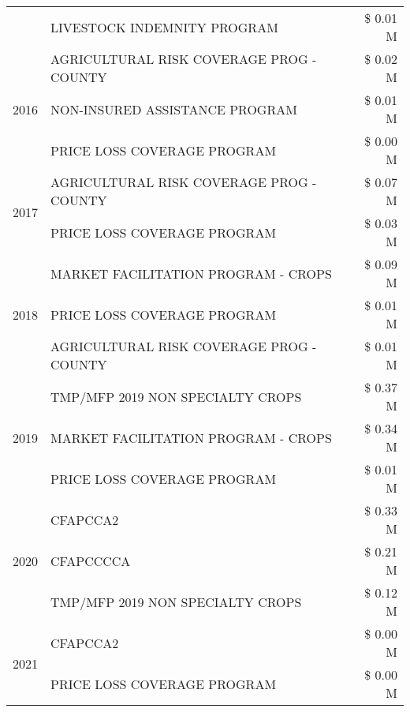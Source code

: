 \begin{tabular}{llr}
 & LIVESTOCK INDEMNITY PROGRAM & \$ 0.01 M \\
\cline{1-3}
\multirow[t]{3}{*}{2016} & AGRICULTURAL RISK COVERAGE PROG - COUNTY & \$ 0.02 M \\
 & NON-INSURED ASSISTANCE PROGRAM & \$ 0.01 M \\
 & PRICE LOSS COVERAGE PROGRAM & \$ 0.00 M \\
\cline{1-3}
\multirow[t]{2}{*}{2017} & AGRICULTURAL RISK COVERAGE PROG - COUNTY & \$ 0.07 M \\
 & PRICE LOSS COVERAGE PROGRAM & \$ 0.03 M \\
\cline{1-3}
\multirow[t]{3}{*}{2018} & MARKET FACILITATION PROGRAM - CROPS & \$ 0.09 M \\
 & PRICE LOSS COVERAGE PROGRAM & \$ 0.01 M \\
 & AGRICULTURAL RISK COVERAGE PROG - COUNTY & \$ 0.01 M \\
\cline{1-3}
\multirow[t]{3}{*}{2019} & TMP/MFP 2019 NON SPECIALTY CROPS & \$ 0.37 M \\
 & MARKET FACILITATION PROGRAM - CROPS & \$ 0.34 M \\
 & PRICE LOSS COVERAGE PROGRAM & \$ 0.01 M \\
\cline{1-3}
\multirow[t]{3}{*}{2020} & CFAPCCA2 & \$ 0.33 M \\
 & CFAPCCCCA & \$ 0.21 M \\
 & TMP/MFP 2019 NON SPECIALTY CROPS & \$ 0.12 M \\
\cline{1-3}
\multirow[t]{2}{*}{2021} & CFAPCCA2 & \$ 0.00 M \\
 & PRICE LOSS COVERAGE PROGRAM & \$ 0.00 M \\
\cline{1-3}
\bottomrule
\end{tabular}

